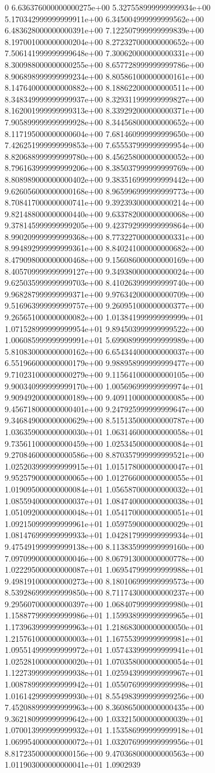 0	6.636376000000000275e+00	5.327558999999999934e+00	5.170342999999999911e+00	6.345004999999999562e+00	6.483628000000000391e+00	7.122507999999999839e+00	8.197001000000000204e+00	8.272327000000000652e+00	7.506141999999999648e+00	7.300620000000000331e+00	8.300988000000000255e+00	8.657728999999999786e+00	8.906898999999999234e+00	8.805861000000000161e+00	8.147640000000000882e+00	8.188622000000000511e+00	8.348349999999999937e+00	8.329311999999999827e+00	8.162001999999999313e+00	8.339292000000000371e+00	7.905899999999999928e+00	8.344568000000000652e+00	8.117195000000000604e+00	7.681460999999999650e+00	7.426251999999999853e+00	7.655537999999999954e+00	8.820688999999999780e+00	8.456258000000000052e+00	8.796163999999999206e+00	8.385037999999999769e+00	8.808989000000000402e+00	9.383516999999999442e+00	9.626056000000000168e+00	8.965996999999999773e+00	8.708417000000000741e+00	9.392393000000000214e+00	9.821488000000000440e+00	9.633782000000000068e+00	9.378145999999999205e+00	9.423792999999999864e+00	8.990209999999999368e+00	8.773227000000000331e+00	8.994892999999999361e+00	8.840241000000000682e+00	8.479098000000000468e+00	9.156086000000000169e+00	8.405709999999999127e+00	9.349380000000000024e+00	9.625035999999999703e+00	8.410263999999999740e+00	9.968287999999999371e+00	9.976342000000000709e+00	9.516963999999999757e+00	9.260951000000000377e+00	9.265651000000000082e+00	1.013841999999999999e+01	1.071528999999999954e+01	9.894503999999999522e+00	1.006085999999999991e+01	5.699089999999999989e+00	5.810830000000000162e+00	6.654344000000000037e+00	6.551966000000000179e+00	9.988958999999999477e+00	9.710231000000000279e+00	9.115641000000000105e+00	9.900340999999999170e+00	1.005696999999999974e+01	9.909492000000000189e+00	9.409110000000000085e+00	9.456718000000000401e+00	9.247925999999999647e+00	9.346849000000000629e+00	8.515135000000000787e+00	1.036359000000000030e+01	1.063146000000000058e+01	9.735611000000000459e+00	1.025345000000000084e+01	9.270846000000000586e+00	8.870357999999999521e+00	1.025203999999999915e+01	1.015178000000000047e+01	9.952579000000000065e+00	1.012766000000000055e+01	1.019095000000000084e+01	1.056587000000000032e+01	1.085594000000000037e+01	1.084740000000000038e+01	1.051092000000000048e+01	1.054170000000000051e+01	1.092150999999999961e+01	1.059759000000000029e+01	1.081476999999999933e+01	1.042817999999999934e+01	9.475491999999999138e+00	8.113835999999999160e+00	7.097099000000000046e+00	8.067913000000000778e+00	1.022295000000000087e+01	1.069547999999999988e+01	9.498191000000000273e+00	8.180106999999999573e+00	8.539286999999999850e+00	8.711743000000000237e+00	9.295607000000000397e+00	1.068407999999999980e+01	1.158877999999999986e+01	1.159938999999999965e+01	1.173963999999999963e+01	1.218683000000000050e+01	1.215761000000000003e+01	1.167553999999999981e+01	1.095514999999999972e+01	1.057433999999999941e+01	1.025281000000000020e+01	1.070358000000000054e+01	1.122739999999999938e+01	1.025943999999999967e+01	1.008789999999999942e+01	1.055076999999999998e+01	1.016142999999999930e+01	8.554983999999999256e+00	7.452088999999999963e+00	8.360865000000000435e+00	9.362180999999999642e+00	1.033215000000000039e+01	1.070013999999999932e+01	1.153586999999999918e+01	1.069954000000000072e+01	1.032076999999999956e+01	8.817235000000000156e+00	9.470368000000000563e+00	1.011903000000000041e+01	1.0902939